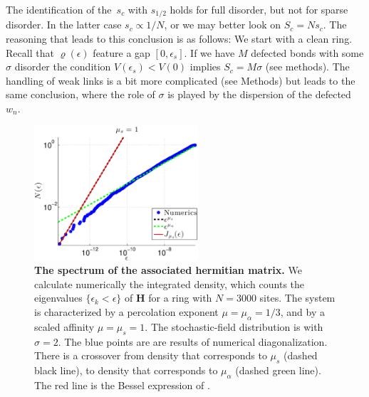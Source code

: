 \documentclass[aps,pre,floats,floatfix,twocolumn]{revtex4}
\begin{document}
The identification of the~$s_c$ with $s_{1/2}$ holds for full disorder, 
but not for sparse disorder. In the latter case ${s_c \propto 1/N}$, 
or we may better look on ${S_c=Ns_c}$. 
The reasoning that leads to this conclusion is as follows: 
We start with a clean ring. Recall that $\varrho(\epsilon)$ 
feature a gap ${[0,\epsilon_s]}$. If we have $M$ defected 
bonds with some $\sigma$ disorder the condition ${V(\epsilon_s)<V(0)}$
implies ${S_c=M\sigma}$ (see methods).
The handling of weak links is a bit more complicated (see Methods)
but leads to the same conclusion, where the role of $\sigma$ 
is played by the dispersion of the defected~$w_n$.     
  

\begin{figure}
\includegraphics[height=5cm]{N_E_1_1_french}

\caption{\label{fdos}
{\bf The spectrum of the associated hermitian matrix.}
We calculate numerically the integrated density, 
which counts the eigenvalues ${\{\epsilon_k<\epsilon\}}$ of $\bm{H}$ 
for a ring with $N{=}3000$ sites. 
The system is characterized by a percolation exponent ${\mu=\mu_{\alpha}=1/3}$, 
and by a scaled affinity ${\mu=\mu_s=1}$. 
The stochastic-field distribution is with $\sigma{=}2$. 
The blue points are are results of numerical diagonalization. 
There is a crossover from density that corresponds to $\mu_s$ (dashed black line), 
to density that corresponds to $\mu_{\alpha}$ (dashed green line). 
The red line is the Bessel expression of \cite{odh3}. 
}
\end{figure}
\end{document}
